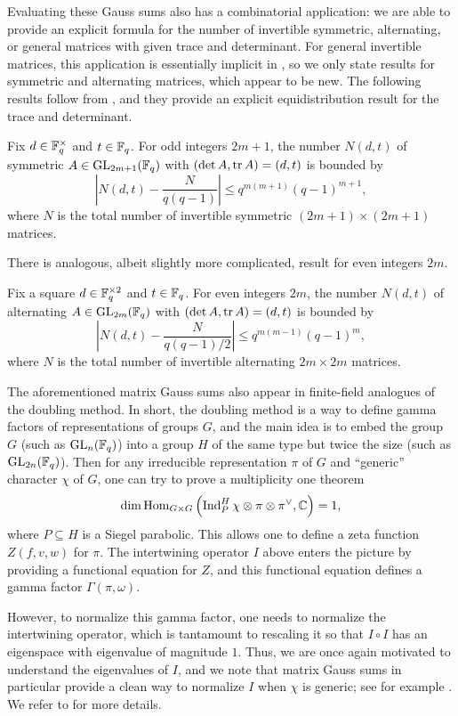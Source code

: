 \documentclass{amsart}
\begin{document}
Evaluating these Gauss sums also has a combinatorial application: we are able to provide an explicit formula for the number of invertible symmetric, alternating, or general matrices with given trace and determinant. For general invertible matrices, this application is essentially implicit in \cite[Theorem~6.2]{kim-gauss-sum}, so we only state results for symmetric and alternating matrices, which appear to be new. The following results follow from , and they provide an explicit equidistribution result for the trace and determinant.
\begin{theorem}
    Fix $d\in\mathbb F_q^\times$ and $t\in\mathbb F_q$. For odd integers $2m+1$, the number $N(d,t)$ of symmetric $A\in\mathrm{GL}_{2m+1}(\mathbb F_q)$ with $(\det A,\operatorname{tr} A)=(d,t)$ is bounded by
    \[\left|N(d,t)-\frac N{q(q-1)}\right|\le q^{m(m+1)}(q-1)^{m+1},\]
    where $N$ is the total number of invertible symmetric $(2m+1)\times(2m+1)$ matrices.
\end{theorem}
\begin{remark}
    There is analogous, albeit slightly more complicated, result for even integers $2m$.
\end{remark}
\begin{theorem}
    Fix a square $d\in\mathbb F_q^{\times2}$ and $t\in\mathbb F_q$. For even integers $2m$, the number $N(d,t)$ of alternating $A\in\mathrm{GL}_{2m}(\mathbb F_q)$ with $(\det A,\operatorname{tr} A)=(d,t)$ is bounded by
    \[\left|N(d,t)-\frac N{q(q-1)/2}\right|\le q^{m(m-1)}(q-1)^m,\]
    where $N$ is the total number of invertible alternating $2m\times2m$ matrices.
\end{theorem}
\begin{remark} \label{rem:double}
    The aforementioned matrix Gauss sums also appear in finite-field analogues of the doubling method. In short, the doubling method is a way to define gamma factors of representations of groups $G$, and the main idea is to embed the group $G$ (such as $\mathrm{GL}_n(\mathbb F_q)$) into a group $H$ of the same type but twice the size (such as $\mathrm{GL}_{2n}(\mathbb F_q)$). Then for any irreducible representation $\pi$ of $G$ and ``generic'' character $\chi$ of $G$, one can try to prove a multiplicity one theorem
    \[\dim\operatorname{Hom}_{G\times G}\left(\operatorname{Ind}_P^H\chi\otimes\pi\otimes\pi^\lor,\mathbb C\right)=1,\]
    where $P\subseteq H$ is a Siegel parabolic. This allows one to define a zeta function $Z(f,v,w)$ for $\pi$. The intertwining operator $I$ above enters the picture by providing a functional equation for $Z$, and this functional equation defines a gamma factor $\Gamma(\pi,\omega)$.
    
    However, to normalize this gamma factor, one needs to normalize the intertwining operator, which is tantamount to rescaling it so that $I\circ I$ has an eigenspace with eigenvalue of magnitude $1$. Thus, we are once again motivated to understand the eigenvalues of $I$, and we note that matrix Gauss sums in particular provide a clean way to normalize $I$ when $\chi$ is generic; see for example \cite[Section~3.6]{chang-doubling}.
    We refer to \cite{chang-doubling} for more details.
\end{remark}
\end{document}
